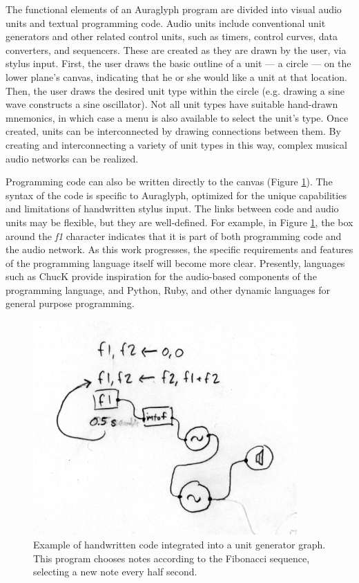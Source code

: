 \documentclass[10pt,letterpaper]{article}
\begin{document}
The functional elements of an Auraglyph program are divided into visual audio units and textual programming code. 
Audio units include conventional unit generators and other related control units, such as timers, control curves, data converters, and sequencers. 
These are created as they are drawn by the user, via stylus input. 
First, the user draws the basic outline of a unit --- a circle --- on the lower plane's canvas, indicating that he or she would like a unit at that location. 
Then, the user draws the desired unit type within the circle (e.g. drawing a sine wave constructs a sine oscillator). 
Not all unit types have suitable hand-drawn mnemonics, in which case a menu is also available to select the unit's type. 
Once created, units can be interconnected by drawing connections between them. 
By creating and interconnecting a variety of unit types in this way, complex musical audio networks can be realized. 

Programming code can also be written directly to the canvas (Figure \ref{fig:auraglyphCode}). 
The syntax of the code is specific to Auraglyph, optimized for the unique capabilities and limitations of handwritten stylus input. 
The links between code and audio units may be flexible, but they are well-defined. 
For example, in Figure \ref{fig:auraglyphCode}, the box around the \textit{f1} character indicates that it is part of both programming code and the audio network. 
As this work progresses, the specific requirements and features of the programming language itself will become more clear. 
Presently, languages such as ChucK provide inspiration for the audio-based components of the programming language, and Python, Ruby, and other dynamic languages for general purpose programming. 

\begin{figure}[h!]
	\centering
		\includegraphics[width=0.9\textwidth]{figures/HWCM-codeblock.jpeg}
	\caption{Example of handwritten code integrated into a unit generator graph. This program chooses notes according to the Fibonacci sequence, selecting a new note every half second. }
	\label{fig:auraglyphCode}
\end{figure}
\end{document}

